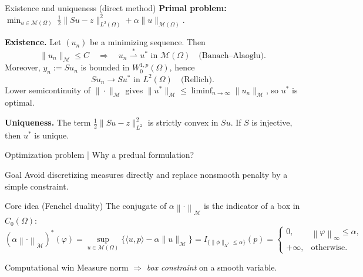 \documentclass[aspectratio=169]{beamer}
\newcommand{\Om}{\Omega}
\newcommand{\M}{\mathcal{M}}
\newcommand{\norm}[1]{\left\lVert #1\right\rVert}
\begin{document}


\begin{frame}{Existence and uniqueness (direct method)}
\textbf{Primal problem:}\;
$\displaystyle
\min_{u\in\M(\Omega)}\;
\frac12\|Su-z\|_{L^2(\Omega)}^2+\alpha\|u\|_{\M(\Omega)}.
$

\medskip
\textbf{Existence.}
Let $(u_n)$ be a minimizing sequence. Then
\[
\|u_n\|_{\M}\le C \quad\Rightarrow\quad
u_n \stackrel{*}{\rightharpoonup} u^\ast \text{ in }\M(\Omega)
\quad\text{(Banach--Alaoglu)}.
\]
Moreover, $y_n:=Su_n$ is bounded in $W^{1,p}_0(\Omega)$, hence
\[
Su_n \to Su^\ast \text{ in }L^2(\Omega)
\quad\text{(Rellich)}.
\]
Lower semicontinuity of $\|\cdot\|_{\M}$ gives
$\|u^\ast\|_{\M}\le\liminf_{n\to\infty}\|u_n\|_{\M}$, so $u^\ast$ is optimal.

\medskip
\textbf{Uniqueness.}
The term $\frac12\|Su-z\|_{L^2}^2$ is strictly convex in $Su$.
If $S$ is injective, then $u^\ast$ is unique.
\end{frame}


\begin{frame}{Optimization problem | Why a predual formulation?}
\begin{block}{Goal}
Avoid discretizing measures directly and replace nonsmooth penalty by a simple constraint.
\end{block}

\begin{block}{Core idea (Fenchel duality)}
The conjugate of $\alpha\norm{\cdot}_\M$ is the indicator of a box in $C_0(\Om)$:
\[
(\alpha\norm{\cdot}_\M)^\ast(\varphi) = \sup_{u\in\mathcal M(\Omega)}\{\langle u,p\rangle-\alpha\|u\|_{\mathcal M}\} 
=  I_{\{\|\phi\|_{X^*}\le \alpha\}}(p)
=
\begin{cases}
0, & \norm{\varphi}_\infty \le \alpha,\\
+\infty, & \text{otherwise}.
\end{cases}
\]
\end{block}

\begin{alertblock}{Computational win}
Measure norm $\Rightarrow$ \emph{box constraint} on a smooth variable.
\end{alertblock}
\end{frame}
\end{document}
